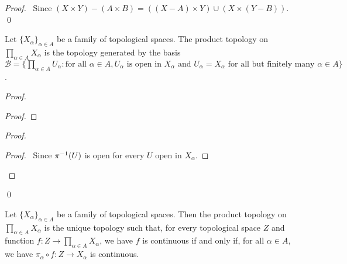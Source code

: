 \begin{proof}
\pf\ Since $(X \times Y) - (A \times B) = ((X - A) \times Y) \cup (X \times (Y - B))$. \qed
\end{proof}

\begin{prop}
\label{prop:product_basis}
Let $\{ X_\alpha \}_{\alpha \in A}$ be a family of topological spaces. The product topology on $\prod_{\alpha \in A} X_\alpha$ is the topology generated by the basis $\mathcal{B} = \{ \prod_{\alpha \in A} U_\alpha : \text{for all } \alpha \in A, U_\alpha \text{ is open in } X_\alpha \text{ and } U_\alpha = X_\alpha \text{ for all but finitely many } \alpha \in A \}$.
\end{prop}

\begin{proof}
\pf
{}
\begin{proof}
\end{proof}
\begin{proof}
	\begin{proof}
		\pf\ Since ${\pi}^{-1}(U)$ is open for every $U$ open in $X_\alpha$.
	\end{proof}
\end{proof}
\qed
\end{proof}

\begin{thm}
\label{thm:product_universal}
Let $\{ X_\alpha \}_{\alpha \in A}$ be a family of topological spaces. Then the product topology on $\prod_{\alpha \in A} X_\alpha$ is the unique topology such that, for every topological space $Z$ and function $f : Z \rightarrow \prod_{\alpha \in A} X_\alpha$, we have $f$ is continuous if and only if, for all $\alpha \in A$, we have $\pi_\alpha \circ f : Z \rightarrow X_\alpha$ is continuous.
\end{thm}

